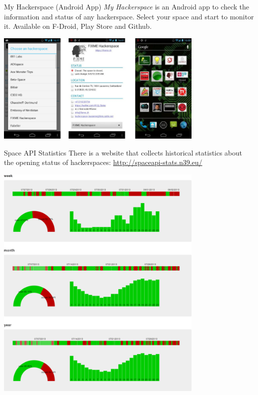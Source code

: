 \begin{frame}{My Hackerspace (Android App)}
	\textit{My Hackerspace} is an Android app to check the information and status
	of any hackerspace. Select your space and start to monitor it. Available on
	F-Droid, Play Store and Github.

	\vspace{1em}
	\centerline{
		\includegraphics[width=0.75\textwidth]{what_is_the_spaceapi/app-my-hackerspace.png}
	}

\end{frame}

\begin{frame}{Space API Statistics}
	There is a website that collects historical statistics about the opening
	status of hackerspaces: \url{http://spaceapi-stats.n39.eu/}

	\vspace{1em}
	\centerline{
		\includegraphics[width=0.75\textwidth]{what_is_the_spaceapi/app-statistics.png}
	}

\end{frame}

